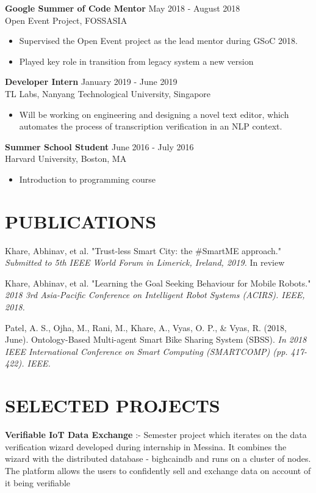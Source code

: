 \documentclass[margin, 7pt]{res} %
\begin{document}
\begin{resume}
\textbf{Google Summer of Code Mentor}  \hfill May 2018 - August 2018 \\
Open Event Project, FOSSASIA
\begin{itemize}
    \item Supervised the Open Event project as the lead mentor during GSoC 2018.
    \item Played key role in transition from legacy system a new version
\end{itemize}

\textbf{Developer Intern} \hfill January 2019 - June 2019 \\
TL Labs, Nanyang Technological University, Singapore
\begin{itemize}
\item Will be working on engineering and designing a novel text editor, which automates the process of transcription verification in an NLP context.
\end{itemize}

\textbf{Summer School Student} \hfill June 2016 - July 2016\\
Harvard University, Boston, MA
\begin{itemize}
\item Introduction to programming course
\end{itemize} 


\section{PUBLICATIONS}
Khare, Abhinav, et al. "Trust-less Smart City: the \#SmartME approach." {\sl Submitted to 5th IEEE World Forum in Limerick, Ireland, 2019.}  \hfill In review

Khare, Abhinav, et al. "Learning the Goal Seeking Behaviour for Mobile Robots." {\sl 2018 3rd Asia-Pacific Conference on Intelligent Robot Systems (ACIRS). IEEE, 2018.} 

Patel, A. S., Ojha, M., Rani, M., Khare, A., Vyas, O. P., \& Vyas, R. (2018, June). Ontology-Based Multi-agent Smart Bike Sharing System (SBSS). {\sl In 2018 IEEE International Conference on Smart Computing (SMARTCOMP) (pp. 417-422). IEEE.} 

\section{SELECTED PROJECTS}
\textbf{Verifiable IoT Data Exchange} :- Semester project which iterates on the data verification wizard developed  during internship in Messina. It combines the wizard with the distributed database - bighcaindb and runs on a cluster of nodes. The platform allows the users to confidently sell and exchange data on account of it being verifiable


\end{resume}
\end{document}
